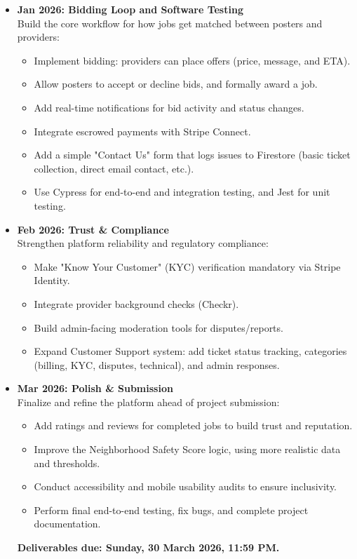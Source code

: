 \documentclass[11pt]{article}
\begin{document}
\begin{itemize}[leftmargin=1.4em]
\begin{itemize}
  \end{itemize}
  \item \textbf{Jan 2026: Bidding Loop and Software Testing} \\
  Build the core workflow for how jobs get matched between posters and providers:
  \begin{itemize}
    \item Implement bidding: providers can place offers (price, message, and ETA).
    \item Allow posters to accept or decline bids, and formally award a job.
    \item Add real-time notifications for bid activity and status changes.
    \item Integrate escrowed payments with Stripe Connect.
    \item Add a simple "Contact Us" form that logs issues to Firestore (basic ticket collection, direct email contact, etc.).
    \item Use Cypress for end-to-end and integration testing, and Jest for unit testing.
  \end{itemize}
  \item \textbf{Feb 2026: Trust \& Compliance} \\
    Strengthen platform reliability and regulatory compliance:
    \begin{itemize}
      \item Make "Know Your Customer" (KYC) verification mandatory via Stripe Identity.
      \item Integrate provider background checks (Checkr).
      \item Build admin-facing moderation tools for disputes/reports.
      \item Expand Customer Support system: add ticket status tracking, categories (billing, KYC, disputes, technical), and admin responses.
    \end{itemize}
  \item \textbf{Mar 2026: Polish \& Submission} \\
    Finalize and refine the platform ahead of project submission:
    \begin{itemize}
      \item Add ratings and reviews for completed jobs to build trust and reputation.
      \item Improve the Neighborhood Safety Score logic, using more realistic data and thresholds.
      \item Conduct accessibility and mobile usability audits to ensure inclusivity.
      \item Perform final end-to-end testing, fix bugs, and complete project documentation.
    \end{itemize}
  \textbf{Deliverables due: Sunday, 30 March 2026, 11:59 PM.}
\end{itemize}
\end{document}
